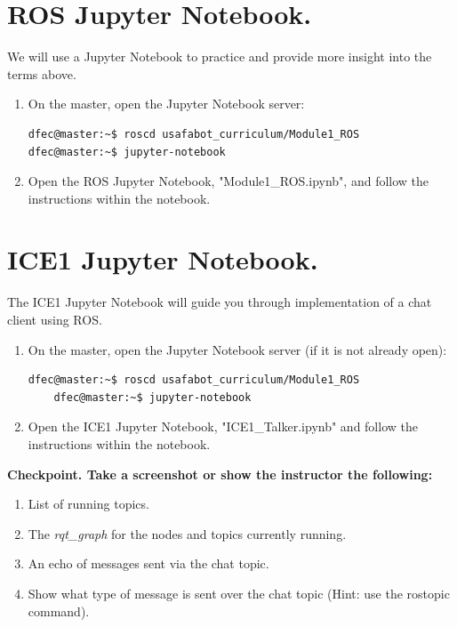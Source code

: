 \documentclass{handout}
\begin{document}
\newpage
\clearpage
\pagebreak

\section{ROS Jupyter Notebook.}
We will use a Jupyter Notebook to practice and provide more insight into the terms above.

\begin{enumerate}
\item On the master, open the Jupyter Notebook server:

\begin{lstlisting}[language=bash]
dfec@master:~$ roscd usafabot_curriculum/Module1_ROS
dfec@master:~$ jupyter-notebook
\end{lstlisting}

\item Open the ROS Jupyter Notebook, "Module1\_ROS.ipynb", and follow the instructions within the notebook.

\end{enumerate}

\section{ICE1 Jupyter Notebook.}
The ICE1 Jupyter Notebook will guide you through implementation of a chat client using ROS.

\begin{enumerate}\setlength\itemsep{1em}
	\item On the master, open the Jupyter Notebook server (if it is not already open):
\begin{lstlisting}[language=bash]
	dfec@master:~$ roscd usafabot_curriculum/Module1_ROS
	dfec@master:~$ jupyter-notebook
\end{lstlisting}

\item Open the ICE1 Jupyter Notebook, "ICE1\_Talker.ipynb" and follow the instructions within the notebook. 
\end{enumerate}

\textbf{Checkpoint. Take a screenshot or show the instructor the following:}
\begin{enumerate}
	\item List of running topics.
	\item The \textit{rqt\_graph} for the nodes and topics currently running.
	\item An echo of messages sent via the chat topic.
	\item Show what type of message is sent over the chat topic (Hint: use the rostopic command).
\end{enumerate}
\end{document}
